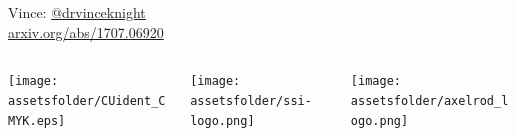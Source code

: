 \documentclass{beamer}
\newcommand{\assetsfolder}{./assets}
\begin{document}
    \begin{frame}
        \begin{center}
            \Large
               Vince: \href{https://twitter.com/drvinceknight}{@drvinceknight}\\

               \href{https://arxiv.org/abs/1707.06920}{arxiv.org/abs/1707.06920}
               \vfill
               \begin{columns}
                   \begin{column}{.3\textwidth}
                       \begin{center}
                       \texttt{[image: \\assetsfolder/CUident\_CMYK.eps]}
                       \end{center}
                   \end{column}
                   \begin{column}{.3\textwidth}
                       \begin{center}
                       \texttt{[image: \\assetsfolder/ssi-logo.png]}
                       \end{center}
                   \end{column}
                   \begin{column}{.3\textwidth}
                       \begin{center}
                       \texttt{[image: \\assetsfolder/axelrod\_logo.png]}
                       \end{center}
                   \end{column}
               \end{columns}
        \end{center}

    \end{frame}

    \begin{frame}
        
    \end{frame}
\end{document}
